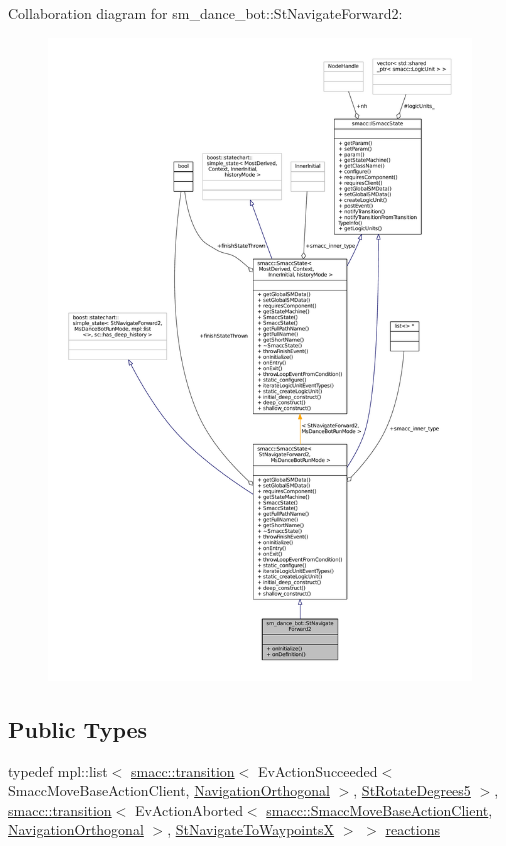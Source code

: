 Collaboration diagram for sm\+\_\+dance\+\_\+bot\+:\+:St\+Navigate\+Forward2\+:
\nopagebreak
\begin{figure}[H]
\begin{center}
\leavevmode
\includegraphics[width=350pt]{structsm__dance__bot_1_1StNavigateForward2__coll__graph}
\end{center}
\end{figure}
\subsection*{Public Types}
\begin{DoxyCompactItemize}
\item 
typedef mpl\+::list$<$ \hyperlink{classsmacc_1_1transition}{smacc\+::transition}$<$ Ev\+Action\+Succeeded$<$ Smacc\+Move\+Base\+Action\+Client, \hyperlink{classsm__dance__bot_1_1NavigationOrthogonal}{Navigation\+Orthogonal} $>$, \hyperlink{structsm__dance__bot_1_1StRotateDegrees5}{St\+Rotate\+Degrees5} $>$, \hyperlink{classsmacc_1_1transition}{smacc\+::transition}$<$ Ev\+Action\+Aborted$<$ \hyperlink{classsmacc_1_1SmaccMoveBaseActionClient}{smacc\+::\+Smacc\+Move\+Base\+Action\+Client}, \hyperlink{classsm__dance__bot_1_1NavigationOrthogonal}{Navigation\+Orthogonal} $>$, \hyperlink{structsm__dance__bot_1_1StNavigateToWaypointsX}{St\+Navigate\+To\+WaypointsX} $>$ $>$ \hyperlink{structsm__dance__bot_1_1StNavigateForward2_ac122ffa9560f45a74b978d912ef2c3ed}{reactions}
\end{DoxyCompactItemize}
